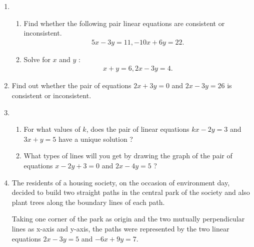 %
\begin{enumerate}[label=\thesection.\arabic*.,ref=\thesection.\theenumi]
\item 
\begin{enumerate}
    \item Find whether the following pair linear equations are consistent or 
inconsistent.
\begin{align}
        5x-3y=11, -10x+6y=22.
\end{align}
    \item Solve for $x$ and $y$ :
\begin{align}
     x+y=6, 2x-3y=4.
\end{align}   
 \end{enumerate}
 \item Find out whether the pair of equations $2x+3y=0$ and $2x-3y=26$ is consistent or inconsistent.
\item 
\begin{enumerate}
    \item For what values of $k$, does the pair of linear equations $kx-2y=3$ and $3x+y=5$ have a unique solution ?
    \item What types of lines will you get by drawing the graph of the pair of equations $x-2y+3=0$ and $2x-4y=5$ ?
\end{enumerate}
\item The residents of a housing society, on the occasion of environment day, decided to build two straight paths in the central park of the society and also plant trees along the boundary lines of each path.

Taking one corner of the park as origin and the two mutually perpendicular lines as x-axis and y-axis, the paths were represented by the two linear equations $2x-3y=5$ and $-6x+9y=7$.


\end{enumerate}
